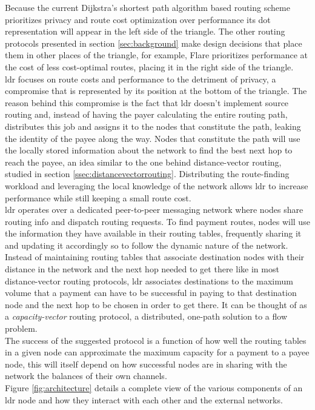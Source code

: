 Because the current Dijkstra's shortest path algorithm based routing scheme prioritizes privacy and route cost optimization over performance its dot representation will appear in the left side of the triangle. The other routing protocols presented in section \ref{sec:background} make design decisions that place them in other places of the triangle, for example, Flare prioritizes performance at the cost of less cost-optimal routes, placing it in the right side of the triangle. \\
\acrshort{ldr} focuses on route costs and performance to the detriment of privacy, a compromise that is represented by its position at the bottom of the triangle. The reason behind this compromise is the fact that \acrshort{ldr} doesn't implement source routing and, instead of having the payer calculating the entire routing path, distributes this job and assigns it to the nodes that constitute the path, leaking the identity of the payee along the way. Nodes that constitute the path will use the locally stored information about the network to find the best next hop to reach the payee, an idea similar to the one behind distance-vector routing, studied in section \ref{ssec:distancevectorrouting}. Distributing the route-finding workload and leveraging the local knowledge of the network allows \acrshort{ldr} to increase performance while still keeping a small route cost. \\
\acrshort{ldr} operates over a dedicated peer-to-peer messaging network where nodes share routing info and dispatch routing requests. To find payment routes, nodes will use the information they have available in their routing tables, frequently sharing it and updating it accordingly so to follow the dynamic nature of the network. Instead of maintaining routing tables that associate destination nodes with their distance in the network and the next hop needed to get there like in most distance-vector routing protocols, \acrshort{ldr} associates destinations to the maximum volume that a payment can have to be successful in paying to that destination node and the next hop to be chosen in order to get there. It can be thought of as a \textit{capacity-vector} routing protocol, a distributed, one-path solution to a flow problem. \\
The success of the suggested protocol is a function of how well the routing tables in a given node can approximate the maximum capacity for a payment to a payee node, this will itself depend on how successful nodes are in sharing with the network the balances of their own channels. \\
Figure \ref{fig:architecture} details a complete view of the various components of an \acrshort{ldr} node and how they interact with each other and the external networks.

